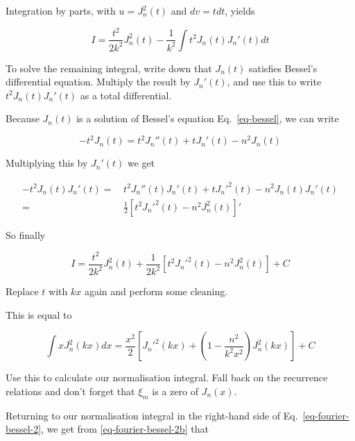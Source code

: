 Integration by parts, with $u=J_n^2(t)$ and $dv=t dt$, yields

\begin{equation}
I = \frac{t^2}{2 k^2}J_n^2(t) - \frac{1}{k^2} \int t^2 J_n(t) J_n'(t) dt
\end{equation}

\begin{cue}
  To solve the remaining integral, write down that $J_n(t)$ satisfies Bessel's differential equation. Multiply the result by $J_n'(t)$, and use this to write $t^2 J_n(t) J_n'(t)$ as a total differential. 
\end{cue}

Because $J_n(t)$ is a solution of Bessel's equation Eq.~\ref{eq-bessel}, we can write

\begin{equation} 
- t^2 J_n(t) = t^2 J_n''(t) + t J_n'(t) - n^2 J_n(t)
\end{equation}

Multiplying this by $J_n'(t)$ we get

\begin{align} 
- t^2 J_n(t) J_n'(t) = &\, t^2 J_n''(t)J_n'(t) + t J_n'^2(t) - n^2 J_n(t)J_n'(t) \nonumber \\
 = &\, \frac{1}{2} \left[{t^2 J_n'^2(t) - n^2 J_n^2(t)}\right]'
\end{align}

So finally

\begin{equation}
I = \frac{t^2}{2 k^2}J_n^2(t) + \frac{1}{2 k^2} \left[{t^2 J_n'^2(t) - n^2 J_n^2(t)}\right] + C
\end{equation} 

\begin{cue}
Replace $t$ with $kx$ again and perform some cleaning.
\end{cue}

This is equal to

\begin{equation}
  \int x J_n^2(k x) dx = \frac{x^2}{2}\left[{J_n'^2(kx) + \left(1 - \frac{n^2}{k^2x^2}\right) J_n^2(kx)}\right] + C
\label{eq-fourier-bessel-2b}
\end{equation} 

\begin{cue}
Use this to calculate our normalisation integral. Fall back on the recurrence relations and don't forget that $\xi_m$ is a zero of $J_n(x)$.
\end{cue}

Returning to our normalisation integral in the right-hand side of Eq.~\ref{eq-fourier-bessel-2}, we get from \ref{eq-fourier-bessel-2b} that

